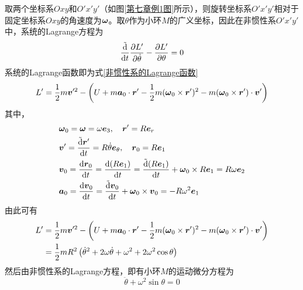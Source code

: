 \begin{solution}
取两个坐标系$Oxy$和$O'x'y'$（如图\ref{第七章例1图}所示），则旋转坐标系$O'x'y'$相对于固定坐标系$Oxy$的角速度为$\boldsymbol{\omega}$。取$\theta$作为小环$M$的广义坐标，因此在非惯性系$O'x'y'$中，系统的Lagrange方程为
\begin{equation*}
	\frac{\tilde{\mathrm{d}}}{\mathrm{d} t} \frac{\partial L'}{\partial \dot{\theta}} - \frac{\partial L'}{\partial \theta} = 0
\end{equation*}
系统的Lagrange函数即为式\eqref{非惯性系的Lagrange函数}
\begin{equation*}
	L' = \frac12 m\boldsymbol{v}'^2 - \left(U + m\boldsymbol{a}_0 \cdot \boldsymbol{r}' - \frac12 m(\boldsymbol{\omega}_0 \times \boldsymbol{r}')^2 - m(\boldsymbol{\omega}_0 \times \boldsymbol{r}') \cdot \boldsymbol{v}'\right)
\end{equation*}
其中，
\begin{align*}
	& \boldsymbol{\omega}_0 = \boldsymbol{\omega} = \omega \boldsymbol{e}_3,\quad \boldsymbol{r}' = R\boldsymbol{e}_r \\
	& \boldsymbol{v}' = \frac{\tilde{\mathrm{d}} \boldsymbol{r}'}{\mathrm{d} t} = R\dot{\theta} \boldsymbol{e}_\theta,\quad \boldsymbol{r}_0 = R\boldsymbol{e}_1 \\ 
	& \boldsymbol{v}_0 = \frac{\mathrm{d} \boldsymbol{r}_0}{\mathrm{d} t} = \frac{\mathrm{d} (R\boldsymbol{e}_1)}{\mathrm{d} t} = \frac{\tilde{\mathrm{d}} (R\boldsymbol{e}_1)}{\mathrm{d} t} + \boldsymbol{\omega}_0 \times R\boldsymbol{e}_1 = R\omega \boldsymbol{e}_2 \\
	& \boldsymbol{a}_0 = \frac{\mathrm{d} \boldsymbol{v}_0}{\mathrm{d} t} = \frac{\tilde{\mathrm{d}} \boldsymbol{v}_0}{\mathrm{d} t} + \boldsymbol{\omega}_0 \times \boldsymbol{v}_0 = -R\omega^2 \boldsymbol{e}_1
\end{align*}
由此可有
\begin{align*}
	L' & = \frac12 m\boldsymbol{v}'^2 - \left(U + m\boldsymbol{a}_0 \cdot \boldsymbol{r}' - \frac12 m(\boldsymbol{\omega}_0 \times \boldsymbol{r}')^2 - m(\boldsymbol{\omega}_0 \times \boldsymbol{r}') \cdot \boldsymbol{v}'\right) \\
	& = \frac12 mR^2 \left(\dot{\theta}^2 + 2\omega \dot{\theta} + \omega^2 + 2\omega^2 \cos \theta\right)
\end{align*}
然后由非惯性系的Lagrange方程，即有小环$M$的运动微分方程为
\begin{equation*}
	\ddot{\theta} + \omega^2 \sin \theta = 0
\end{equation*}


\end{solution}
